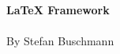 \thispagestyle{empty}
\begin{center}

{\Huge \textbf{LaTeX Framework}}\\
\vspace{1.2cm}
\printdate\\
\vspace{15cm}
By Stefan Buschmann

\end{center}
